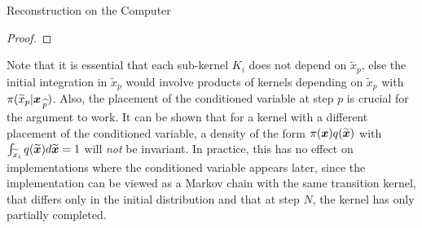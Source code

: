\begin{chapter}{Reconstruction on the Computer}
\begin{proof}
\end{proof}
Note that it is essential that each sub-kernel $K_i$ does not depend on $\tilde x_p$,  else the initial integration in $\tilde x_p$ would involve products of kernels depending on $\tilde x_p$ with $\pi(\widetilde x_p|\mbox{\boldmath$x$}_{\,\widehat{p}})$. %
Also, the placement of the conditioned variable at step $p$ is crucial for the argument to work.  
It can be shown that for a kernel with a different placement of the conditioned variable, a density of the form $\pi(\mbox{\boldmath$x$})q(\widetilde{\mbox{\boldmath$x$}})$ with $\int_{\widetilde x_i} q(\widetilde{\mbox{\boldmath$x$}})d\widetilde{\mbox{\boldmath$x$}} = 1$ will \emph{not} be invariant.
In practice, this has no effect on implementations where the conditioned variable appears later, since the implementation can be viewed as a Markov chain with the same transition kernel, that differs only in the initial distribution and that at step $N$, the kernel has only partially completed.


\end{chapter}
